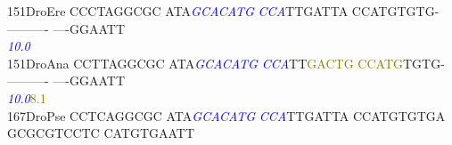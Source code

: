 \documentclass[11pt,twoside,reqno,a4paper]{article}
\begin{document}
{151\hspace*{1\charwidth}DroEre	CCCTAGGCGC	ATA\textit{\textcolor{blue}{G}}\textit{\textcolor{blue}{C}}\textit{\textcolor{blue}{A}}\textit{\textcolor{blue}{C}}\textit{\textcolor{blue}{A}}\textit{\textcolor{blue}{T}}\textit{\textcolor{blue}{G}}	\textit{\textcolor{blue}{C}}\textit{\textcolor{blue}{C}}\textit{\textcolor{blue}{A}}TTGATTA	CCATGTGTG-	----------	----GGAATT	\\
\hspace*{4\charwidth}\hspace*{7\charwidth}\hspace*{1\charwidth}\hspace*{13\charwidth}\textit{\textcolor{blue}{10.0}}\hspace*{1\charwidth}\hspace*{1\charwidth}\hspace*{1\charwidth}\hspace*{1\charwidth}\hspace*{1\charwidth}\\
151\hspace*{1\charwidth}DroAna	CCTTAGGCGC	ATA\textit{\textcolor{blue}{G}}\textit{\textcolor{blue}{C}}\textit{\textcolor{blue}{A}}\textit{\textcolor{blue}{C}}\textit{\textcolor{blue}{A}}\textit{\textcolor{blue}{T}}\textit{\textcolor{blue}{G}}	\textit{\textcolor{blue}{C}}\textit{\textcolor{blue}{C}}\textit{\textcolor{blue}{A}}TT\textcolor{olive}{G}\textcolor{olive}{A}\textcolor{olive}{C}\textcolor{olive}{T}\textcolor{olive}{G}	\textcolor{olive}{C}\textcolor{olive}{C}\textcolor{olive}{A}\textcolor{olive}{T}\textcolor{olive}{G}TGTG-	----------	----GGAATT	\\
\hspace*{4\charwidth}\hspace*{7\charwidth}\hspace*{1\charwidth}\hspace*{13\charwidth}\textit{\textcolor{blue}{10.0}}\hspace*{1\charwidth}\hspace*{8\charwidth}\textcolor{olive}{8.1}\hspace*{1\charwidth}\hspace*{1\charwidth}\hspace*{1\charwidth}\hspace*{1\charwidth}\\
167\hspace*{1\charwidth}DroPse	CCTCAGGCGC	ATA\textit{\textcolor{blue}{G}}\textit{\textcolor{blue}{C}}\textit{\textcolor{blue}{A}}\textit{\textcolor{blue}{C}}\textit{\textcolor{blue}{A}}\textit{\textcolor{blue}{T}}\textit{\textcolor{blue}{G}}	\textit{\textcolor{blue}{C}}\textit{\textcolor{blue}{C}}\textit{\textcolor{blue}{A}}TTGATTA	CCATGTGTGA	GCGCGTCCTC	CATGTGAATT	\\
}
\end{document}
